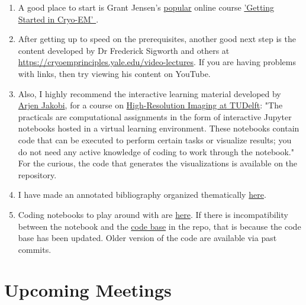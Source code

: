 \documentclass[11pt, oneside]{article}   	%
\begin{document}
\begin{enumerate}
	\item A good place to start is Grant Jensen's \href{https://www.caltech.edu/about/news/grant-jensen-cryo-em}{popular} online course \href{https://jensenlab.caltech.edu/courses/}{'Getting Started in Cryo-EM' }.

	\item After getting up to speed on the prerequisites, another good next step is the content developed by Dr Frederick Sigworth and others at \url{https://cryoemprinciples.yale.edu/video-lectures}. If you are having problems with links, then try viewing his content on YouTube.

	\item  Also, I highly recommend the interactive learning material developed by \href{http://cryoem.tudelft.nl/group/arjen-jakobi/}{Arjen Jakobi}, for a course on \href{https://gitlab.tudelft.nl/aj-lab/teaching/-/wikis/NB4020}{High-Resolution Imaging at TUDelft}: "The practicals are computational assignments in the form of interactive Jupyter notebooks hosted in a virtual learning environment. These notebooks contain code that can be executed to perform certain tasks or visualize results; you do not need any active knowledge of coding to work through the notebook." For the curious, the code that generates the visualizations is available on the repository.
 
	\item I have made an annotated bibliography organized thematically \href{https://github.com/geoffwoollard/learn_cryoem_math#resources}{here}.

	\item Coding notebooks to play around with are \href{https://github.com/geoffwoollard/learn_cryoem_math/tree/master/nb}{here}. If there is incompatibility between the notebook and the \href{https://github.com/geoffwoollard/learn_cryoem_math/tree/master/src}{code base} in the repo, that is because the code base has been updated. Older version of the code are available via past commits.
\end{enumerate}

\pagebreak
\section{Upcoming Meetings}

\pagebreak
\end{document}
